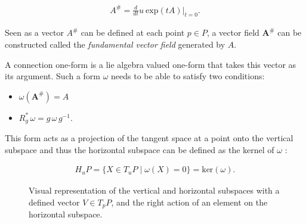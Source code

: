 \documentclass[fleqn, twocolumn, 10pt]{article}
\begin{document}
\begin{ceqn}
\begin{align*}
A^\# = \frac{d}{dt} u\:\text{exp}(tA) \biggr\rvert_{t=0}.
\end{align*}
\end{ceqn}
Seen as a vector $A^\#$ can be defined at each point $p \in P$, a vector field $\mathbf{A^\#}$ can be constructed called the \textit{fundamental vector field} generated by $A$.

A connection one-form is a lie algebra valued one-form that takes this vector as its argument. Such a form $\omega$ needs to be able to satisfy two conditions:

\begin{itemize}
\item $\omega(\mathbf{A^\#}) = A$
\item $R^\ast_g\,\omega = g\,\omega\,g^{-1}$.
\end{itemize}
This form acts as a projection of the tangent space at a point onto the vertical subspace and thus the horizontal subspace can be defined as the kernel of $\omega$ \cite{nakahara2003geometry, kai2015lam, schuller2014geometric, recknagel2006bundles}:

\begin{ceqn}
\begin{align*}
H_uP = \{ X \in T_uP\; \rvert\; \omega(X) = 0\} = \text{ker}(\omega).
\end{align*}
\end{ceqn}

\begin{figure}[t]
\centering
{}
\caption{Visual representation of the vertical and horizontal subspaces with a defined vector $V \in T_pP$, and the right action of an element on the horizontal subspace.}
\end{figure}
\end{document}
